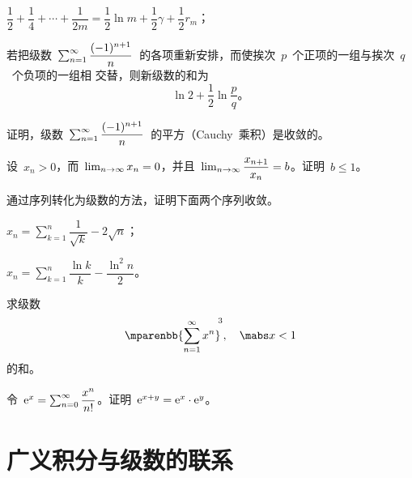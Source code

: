 \begin{exercise}
\begin{exlist}
  \item $\dfrac12+\dfrac14+\dotsb+\dfrac1{2m}=\dfrac12\ln m+\dfrac12\gamma+\dfrac12r_m$；
  \item 若把级数~$\sum_{n=1}^\infty\dfrac{(-1)^{n+1}}n$~的各项重新安排，而使挨次~$p$~个正项的一组与挨次~$q$~个负项的一组相
  交替，则新级数的和为
  \[
    \ln 2+\frac12\ln\frac pq。
  \]
\end{exlist}
\item 证明，级数~$\sum_{n=1}^\infty\dfrac{(-1)^{n+1}}n$~的平方（Cauchy~乘积）是收敛的。
\item 设~$x_n>0$，而~$\lim_{n\to\infty} x_n=0$，并且~$\lim_{n\to\infty}\dfrac{x_{n+1}}{x_n}=b$。证明~$b\leq1$。
\item 通过序列转化为级数的方法，证明下面两个序列收敛。
\begin{exlistcols}
  \item $x_n=\sum_{k=1}^n\dfrac1{\sqrt k}-2\sqrt n$；
  \item $x_n=\sum_{k=1}^n\dfrac{\ln k}k-\dfrac{\ln^2n}2$。
\end{exlistcols}
\item 求级数
\[
  \mparenbb{\sum_{n=1}^\sinf x^n}^{\msp 3}\mcond*{\mabs x<1}
\]
的和。
\item 令~$\mathrm e^x=\sum_{n=0}^\infty\dfrac{x^n}{n!}$。证明~$\mathrm e^{x+y}=\mathrm e^x\cdot\mathrm e^y$。
\end{exercise}

\section{广义积分与级数的联系}

